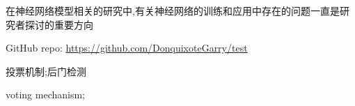 

\begin{zhaiyao}
\begin{spacing}{1.5}
{

在神经网络模型相关的研究中,有关神经网络的训练和应用中存在的问题一直是研究者探讨的重要方向

GitHub repo: \url{https://github.com/DonquixoteGarry/test}
}
\end{spacing}
\end{zhaiyao}

\begin{guanjianci}
投票机制;后门检测
\end{guanjianci}



\begin{abstract}
\begin{spacing}{1.5}

While  Training

\end{spacing}
\end{abstract}


\begin{keywords}
voting mechanism;
\end{keywords} 